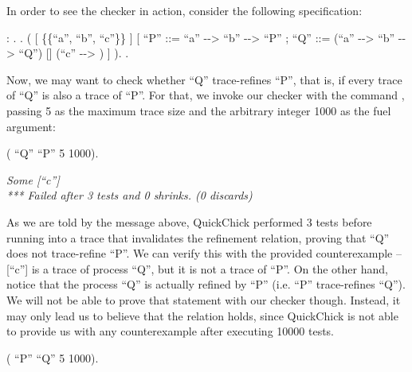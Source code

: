 In order to see the checker  in action, consider the following \CSPcoq{} specification:

\begin{coqdoccode}
	\coqdocnoindent
	  : .\coqdoceol
	\coqdocnoindent
	.\coqdoceol
	\coqdocindent{1.00em}
	 (\coqdoceol
	\coqdocindent{2.00em}
	\coqdoceol
	\coqdocindent{3.00em}
	[  \{\{``a'', ``b'', ``c''\}\} ]\coqdoceol
	\coqdocindent{3.00em}
	[ ``P'' ::= ``a'' -{}-> ``b'' -{}->  ``P'' ;\coqdoceol
	\coqdocindent{4.00em}
	``Q'' ::= (``a'' -{}-> ``b'' -{}->  ``Q'') [] (``c'' -{}-> ) ]\coqdoceol
	\coqdocindent{1.00em}
	).\coqdoceol
	\coqdocnoindent
	.\coqdoceol
\end{coqdoccode}

Now, we may want to check whether ``Q'' trace-refines ``P'', that is, if every trace of ``Q'' is also a trace of ``P''. For that, we invoke our checker with the command , passing 5 as the maximum trace size and the arbitrary integer 1000 as the fuel argument:

\begin{coqdoccode}
	\coqdocnoindent
	 (  ``Q'' ``P'' 5 1000).\coqdoceol
\end{coqdoccode}

\begin{tabbing}
	\emph{Some [``c'']} \\
	\emph{*** Failed after 3 tests and 0 shrinks. (0 discards)}
\end{tabbing}

As we are told by the message above, QuickChick performed 3 tests before running into a trace that invalidates the refinement relation, proving that ``Q'' does not trace-refine ``P''. We can verify this with the provided counterexample -- [``c''] is a trace of process ``Q'', but it is not a trace of ``P''. On the other hand, notice that the process ``Q'' is actually refined by ``P'' (i.e. ``P'' trace-refines ``Q''). We will not be able to prove that statement with our checker though. Instead, it may only lead us to believe that the relation holds, since QuickChick is not able to provide us with any counterexample after executing 10000 tests.

\begin{coqdoccode}
	\coqdocnoindent
	 (  ``P'' ``Q'' 5 1000).\coqdoceol
\end{coqdoccode}

